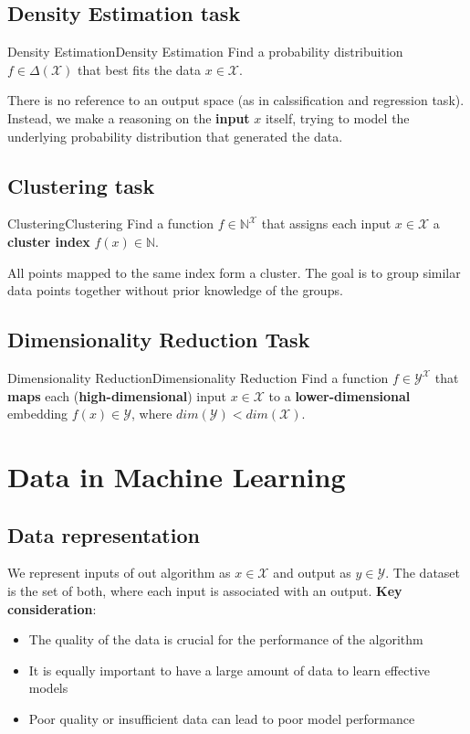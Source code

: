 \documentclass[a4paper]{article}
\theoremstyle{definition}
\begin{document}
\subsection{Density Estimation task}
\begin{definition}{Density Estimation}{Density Estimation}
Find a probability distribuition \( f \in \Delta(\mathcal{X}) \) that best 
fits the data \( x \in \mathcal{X} \).
\end{definition}
There is no reference to an output space (as in calssification and regression task). Instead, we 
make a reasoning on the \textbf{input} \( x \) itself, trying to model the underlying probability 
distribution that generated the data.
\subsection{Clustering task}
\begin{definition}{Clustering}{Clustering}
Find a function \( f \in \mathbb{N}^{\mathcal{X}} \) that assigns each input
\( x \in \mathcal{X} \) a \textbf{cluster index} \( f(x) \in \mathbb{N} \). 
\end{definition}
All points mapped to the same index form a cluster. The goal is to group similar data points 
together without prior knowledge of the groups.
\subsection{Dimensionality Reduction Task}
\begin{definition}{Dimensionality Reduction}{Dimensionality Reduction}
Find a function \( f \in \mathcal{Y}^{\mathcal{X}} \) that \textbf{maps} each (\textbf{high-dimensional}) 
input \( x \in \mathcal{X} \) to a \textbf{lower-dimensional} embedding \( f(x) \in \mathcal{Y} \), where \( dim(\mathcal{Y}) < dim(\mathcal{X}) \). 
\end{definition}
\section{Data in Machine Learning}
\subsection{Data representation}
We represent inputs of out algorithm as \( x \in \mathcal{X} \) and output as \( y \in \mathcal{Y} \). The dataset is the set of both,
where each input is associated with an output.
\vspace{1em}
\noindent
\newline
\textbf{Key consideration}:
\begin{itemize}
    \item The quality of the data is crucial for the performance of the algorithm 
    \item It is equally important to have a large amount of data to learn effective models
    \item Poor quality or insufficient data can lead to poor model performance 
\end{itemize}
\end{document}
